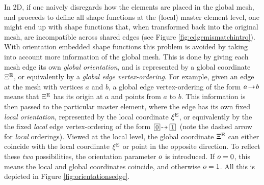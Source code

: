 In 2D, if one naively disregards how the elements are placed in the global mesh, and proceeds to define all shape functions at the (local) master element level, one might end up with shape functions that, when transformed back into the original mesh, are incompatible across shared edges (see Figure \ref{fig:edgemismatchintro}).
With orientation embedded shape functions this problem is avoided by taking into account more information of the global mesh. %
This is done by giving each mesh edge its own \textit{global orientation}, and is represented by a global coordinate $\Xi^{\mathrm{E}}$, or equivalently by a \textit{global edge vertex-ordering}.
For example, given an edge at the mesh with vertices $a$ and $b$, a global edge vertex-ordering of the form $a\!\to\! b$ means that $\Xi^{\mathrm{E}}$ has its origin at $a$ and points from $a$ to $b$.
This information is then passed to the particular master element, where the edge has its own fixed \textit{local orientation}, represented by the local coordinate $\xi^{\mathrm{E}}$, or equivalently by the the fixed \textit{local} edge vertex-ordering of the form $\boxednum{0}\!\tdashto\boxednum{1}$ (note the dashed arrow for \textit{local} orderings).
Viewed at the local level, the global coordinate $\Xi^{\mathrm{E}}$ can either coincide with the local coordinate $\xi^{\mathrm{E}}$ or point in the opposite direction.
To reflect these \textit{two} possibilities, the orientation parameter $o$ is introduced.
If $o=0$, this means the local and global coordinates coincide, and otherwise $o=1$.
All this is depicted in Figure \ref{fig:orientationsedge}. %


